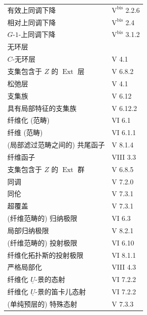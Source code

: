 \begin{longtable}{@{}p{.68\linewidth}p{.27\linewidth}@{}}
有效上同调下降 & $\mathrm{V}^{\mathrm{bis}}$ 2.2.6\\
相对上同调下降 & $\mathrm{V}^{\mathrm{bis}}$ 2.4\\
$G$-$1$-上同调下降 & $\mathrm{V}^{\mathrm{bis}}$ 3.1.2\\
无环层 & \\
$C$-无环层 & V 4.1\\
支集包含于 $Z$ 的 $\operatorname{Ext}$ 层 & V 6.8.2\\
松弛层 & V 4.1\\[.7em]
支集族 & V 6.12\\
具有局部特征的支集族 & V 6.12.2\\
纤维化 (范畴) & VI 6.1\\
纤维 (范畴) & VI 6.1.1\\
(局部滤过范畴之间的) 共尾函子 & V 8.1.4\\
纤维函子 & VIII 3.3\\
支集包含于 $Z$ 的 $\operatorname{Ext}$ 群 & V 6.8.5\\
同调 & V 7.2.0\\
同伦 & V 7.3.1\\
超覆盖 & V 7.3.1\\
(纤维范畴的) 归纳极限 & VI 6.3\\
局部归纳极限 & V 8.2.1\\
(纤维范畴的) 投射极限 & VI 6.10\\
纤维化拓扑斯的投射极限 & VI 8.1.1\\
严格局部化 & VIII 4.3\\
纤维化 $\underline U$-景的态射 & VI 7.2.2\\
纤维化 $\underline U$-景的笛卡儿态射 & VI 7.2.2\\
(单纯预层的) 特殊态射 & V 7.3.3\\

\end{longtable}
